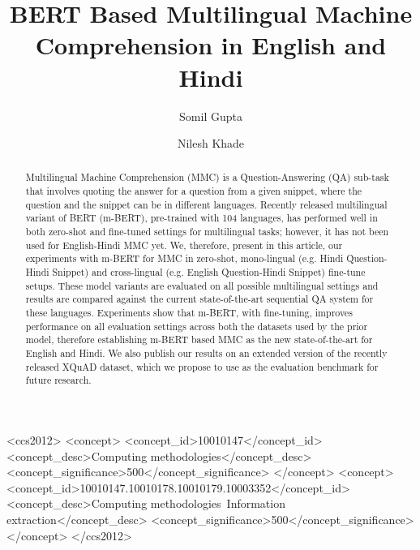 \documentclass[acmsmall]{acmart}
\begin{document}
\title{BERT Based Multilingual Machine Comprehension in English and Hindi}




\author{Somil Gupta}

\author{Nilesh Khade}




\begin{abstract}
Multilingual Machine Comprehension (MMC) is a Question-Answering (QA) sub-task that involves quoting the answer for a question from a given snippet, where the question and the snippet can be in different languages. Recently released multilingual variant of BERT (m-BERT), pre-trained with 104 languages, has performed well in both zero-shot and fine-tuned settings for multilingual tasks; however, it has not been used for English-Hindi MMC yet. We, therefore, present in this article, our experiments with m-BERT for MMC in zero-shot, mono-lingual (e.g. Hindi Question-Hindi Snippet) and cross-lingual (e.g. English Question-Hindi Snippet) fine-tune setups. These model variants are evaluated on all possible multilingual settings and results are compared against the current state-of-the-art sequential QA system for these languages. Experiments show that m-BERT, with fine-tuning, improves performance on all evaluation settings across both the datasets used by the prior model, therefore establishing m-BERT based MMC as the new state-of-the-art for English and Hindi. We also publish our results on an extended version of the recently released XQuAD dataset, which we propose to use as the evaluation benchmark for future research.
\end{abstract}

\begin{CCSXML}
<ccs2012>
   <concept>
       <concept_id>10010147</concept_id>
       <concept_desc>Computing methodologies</concept_desc>
       <concept_significance>500</concept_significance>
       </concept>
   <concept>
       <concept_id>10010147.10010178.10010179.10003352</concept_id>
       <concept_desc>Computing methodologies~Information extraction</concept_desc>
       <concept_significance>500</concept_significance>
       </concept>
 </ccs2012>
\end{CCSXML}

\end{document}
